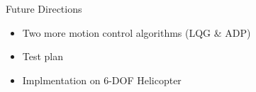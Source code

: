 \documentclass{beamer}
\begin{document}
\begin{frame}{Future Directions}{} %
  \begin{itemize}
    \item Two more motion control algorithms (LQG \& ADP)
    \item Test plan
    \item Implmentation on 6-DOF Helicopter
  \end{itemize}
\end{frame}




\end{document}
